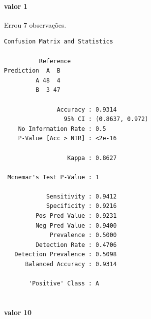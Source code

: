 \documentclass[
  a4paperpaper,
]{article}
\let\oldparagraph\paragraph
\renewcommand{\paragraph}[1]{\oldparagraph{#1}\mbox{}}
\newenvironment{Shaded}{\begin{snugshade}}{\end{snugshade}}
\newcommand{\AttributeTok}[1]{\textcolor[rgb]{0.40,0.45,0.13}{#1}}
\newcommand{\DecValTok}[1]{\textcolor[rgb]{0.68,0.00,0.00}{#1}}
\newcommand{\FunctionTok}[1]{\textcolor[rgb]{0.28,0.35,0.67}{#1}}
\newcommand{\NormalTok}[1]{\textcolor[rgb]{0.00,0.23,0.31}{#1}}
\newcommand{\OtherTok}[1]{\textcolor[rgb]{0.00,0.23,0.31}{#1}}
\newcommand{\SpecialCharTok}[1]{\textcolor[rgb]{0.37,0.37,0.37}{#1}}
\newcommand{\StringTok}[1]{\textcolor[rgb]{0.13,0.47,0.30}{#1}}
\begin{document}
\paragraph{valor 1}\label{valor-1}

Errou 7 observações.

\begin{Shaded}
\end{Shaded}

\begin{verbatim}
Confusion Matrix and Statistics

          Reference
Prediction  A  B
         A 48  4
         B  3 47
                                         
               Accuracy : 0.9314         
                 95% CI : (0.8637, 0.972)
    No Information Rate : 0.5            
    P-Value [Acc > NIR] : <2e-16         
                                         
                  Kappa : 0.8627         
                                         
 Mcnemar's Test P-Value : 1              
                                         
            Sensitivity : 0.9412         
            Specificity : 0.9216         
         Pos Pred Value : 0.9231         
         Neg Pred Value : 0.9400         
             Prevalence : 0.5000         
         Detection Rate : 0.4706         
   Detection Prevalence : 0.5098         
      Balanced Accuracy : 0.9314         
                                         
       'Positive' Class : A              
                                         
\end{verbatim}

\paragraph{valor 10}\label{valor-10}
\end{document}

